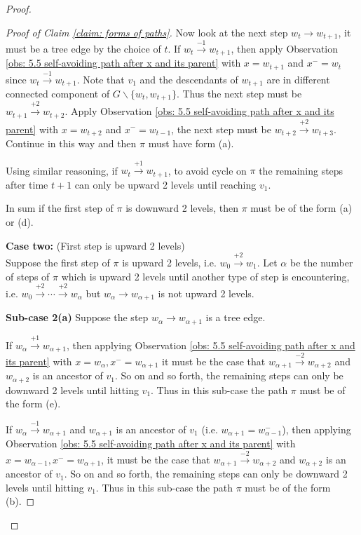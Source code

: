 \documentclass[12pt]{article}
\numberwithin{equation}{section}
\newcommand{\1}{\mathbf{1}}
\begin{document}
\begin{proof}
\begin{proof}[Proof of Claim \ref{claim: forms of paths}]
Now look at the next step $w_t\rightarrow w_{t+1}$, it must be a tree edge by the choice of $t$. 
If $w_t\stackrel{-1}{\rightarrow}w_{t+1}$, then apply Observation \ref{obs: 5.5 self-avoiding path after x and its parent} with $x=w_{t+1}$ and $x^-=w_t$ since $w_t\stackrel{-1}{\rightarrow}w_{t+1}$. Note that $v_{1}$ and the descendants of $w_{t+1}$ are in different connected component of $G\backslash\{w_t,w_{t+1} \}$. Thus the next step must be $w_{t+1}\stackrel{+2}{\rightarrow}w_{t+2}$. 
Apply Observation \ref{obs: 5.5 self-avoiding path after x and its parent} with $x=w_{t+2}$ and $x^-=w_{t-1}$, the next step must be $w_{t+2}\stackrel{+2}{\rightarrow}w_{t+3}$. Continue in this way and then $\pi$ must have form (a).

Using similar reasoning,  if $w_t\stackrel{+1}{\rightarrow}w_{t+1}$, to avoid cycle on $\pi$ the remaining steps after time $t+1$ can only be upward 2 levels until reaching $v_1$.

In sum if the first step of $\pi$ is downward 2 levels, then $\pi$ must be of the form (a) or (d).


 

 	\textbf{Case two:} (First step is upward 2 levels)\\
 	Suppose the first step of $\pi$ is upward 2 levels, i.e. $w_0\stackrel{+2}{\rightarrow}w_1$. Let $\alpha$ be the number of steps of $\pi$ which is upward 2 levels until another type of step is encountering, i.e. $w_0\stackrel{+2}{\rightarrow}\cdots \stackrel{+2}{\rightarrow}w_{\alpha}$ but $w_\alpha\rightarrow w_{\alpha+1}$ is not upward 2 levels.  
 	
 	
 	
 	\textbf{Sub-case 2(a)}
 	Suppose the step $w_\alpha\rightarrow w_{\alpha+1}$ is a tree edge. 
 	
 	If $w_{\alpha}\stackrel{+1}{\rightarrow}w_{\alpha+1}$, then applying Observation \ref{obs: 5.5 self-avoiding path after x and its parent} with $x=w_\alpha,x^-=w_{\alpha+1}$ it must be the case that  $w_{\alpha+1}\stackrel{-2}{\rightarrow} w_{\alpha+2}$ and $w_{\alpha+2}$ is an ancestor of $v_1$. So on and so forth, the remaining steps can only be downward 2 levels until hitting $v_1$. Thus in this sub-case the path $\pi$  must be of the form  (e).  
 	
 	 If $w_{\alpha}\stackrel{-1}{\rightarrow}w_{\alpha+1}$ and $w_{\alpha+1}$ is an ancestor of $v_1$ (i.e. $w_{\alpha+1}=w_{\alpha-1}^-$),
 	 then applying Observation \ref{obs: 5.5 self-avoiding path after x and its parent} with $x=w_{\alpha-1},x^-=w_{\alpha+1}$, it must be the case that  $w_{\alpha+1}\stackrel{-2}{\rightarrow} w_{\alpha+2}$ and $w_{\alpha+2}$ is an ancestor of $v_1$. So on and so forth, the remaining steps can only be downward 2 levels until hitting $v_1$. Thus in this sub-case the path $\pi$  must be of the form  (b). 
 	 

\end{proof}
\end{proof}
\end{document}
